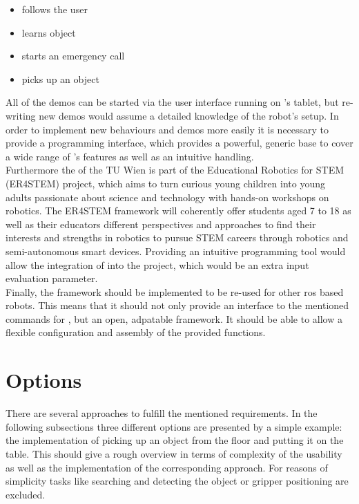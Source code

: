 \begin{itemize}
	\item \hobbit{} follows the user
	\item \hobbit{} learns object
	\item \hobbit{} starts an emergency call
	\item \hobbit{} picks up an object
\end{itemize}

All of the demos can be started via the user interface running on \hobbit{}'s tablet, but re-writing new demos would assume a detailed knowledge of the robot's setup. In order to implement new behaviours and demos more easily it is necessary to provide a programming interface, which provides a powerful, generic base to cover a wide range of \hobbit's features as well as an intuitive handling.\\

Furthermore the \ACIN{} of the TU Wien is part of the Educational Robotics for STEM (ER4STEM) project, which aims to turn curious young children into young adults passionate about science and technology with hands-on workshops on robotics. The ER4STEM framework will coherently offer students aged 7 to 18 as well as their educators different perspectives and approaches to find their interests and strengths in robotics to pursue STEM careers through robotics and semi-autonomous smart devices. \cite{ER4STEMACIN} Providing an intuitive programming tool would allow the integration of \hobbit{} into the project, which would be an extra input evaluation parameter.\\

Finally, the framework should be implemented to be re-used for other \gls{ros} based robots. This means that it should not only provide an interface to the mentioned commands for \hobbit{}, but an open, adpatable framework. It should be able to allow a flexible configuration and assembly of the provided functions.

\section{Options} \label{sec:Options}
There are several approaches to fulfill the mentioned requirements. In the following subsections three different options are presented by a simple example: the implementation of picking up an object from the floor and putting it on the table. This should give a rough overview in terms of complexity of the usability as well as the implementation of the corresponding approach. For reasons of simplicity tasks like searching and detecting the object or gripper positioning are excluded.

